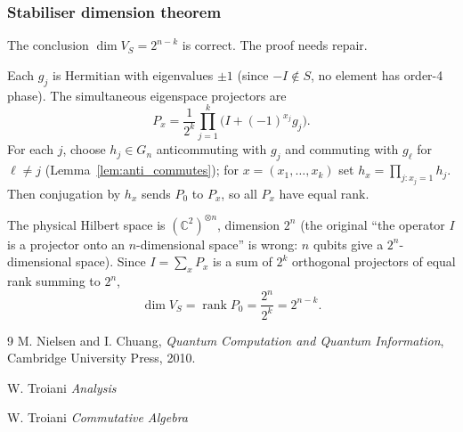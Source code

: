 \documentclass[12pt]{article}
\theoremstyle{plain}
\theoremstyle{definition}
\begin{document}
\subsubsection*{Stabiliser dimension theorem}

The conclusion $\dim V_S=2^{n-k}$ is correct. The proof needs repair.

Each $g_j$ is Hermitian with eigenvalues $\pm 1$ (since $-I\notin S$, no element has order-4 phase). The simultaneous eigenspace projectors are
\[
P_x=\frac{1}{2^k}\prod_{j=1}^k\big(I+(-1)^{x_j}g_j\big).
\]
For each $j$, choose $h_j\in G_n$ anticommuting with $g_j$ and commuting with $g_\ell$ for $\ell\neq j$ (Lemma~\ref{lem:anti_commutes}); for $x=(x_1,\ldots,x_k)$ set $h_x=\prod_{j:x_j=1}h_j$. Then conjugation by $h_x$ sends $P_0$ to $P_x$, so all $P_x$ have equal rank.

The physical Hilbert space is $(\mathbb{C}^2)^{\otimes n}$, dimension $2^n$ (the original ``the operator $I$ is a projector onto an $n$-dimensional space'' is wrong: $n$ qubits give a $2^n$-dimensional space). Since $I=\sum_x P_x$ is a sum of $2^k$ orthogonal projectors of equal rank summing to $2^n$,
\[
\dim V_S=\operatorname{rank}P_0=\frac{2^n}{2^k}=2^{n-k}.
\]

\begin{thebibliography}{9}
 M. Nielsen and I. Chuang, \emph{Quantum Computation and Quantum Information}, Cambridge University Press, 2010.

 W. Troiani \emph{Analysis}

 W. Troiani \emph{Commutative Algebra}
\end{thebibliography}
\end{document}
